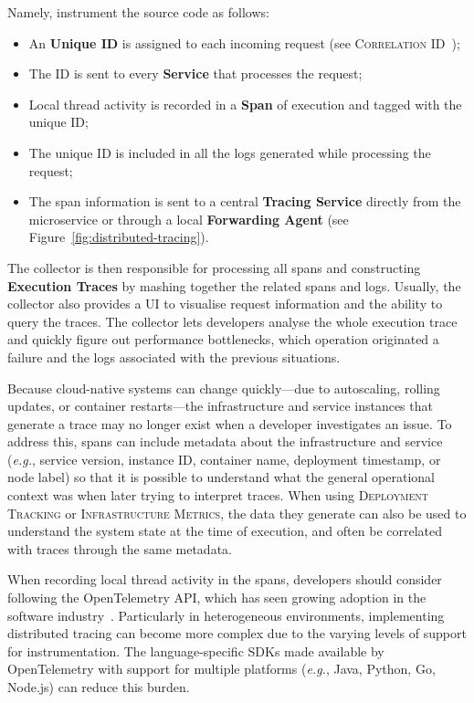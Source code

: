 \documentclass[runningheads]{llncs}
\begin{document}
Namely, instrument the source code as follows:
\begin{itemize}
    \item An \textbf{Unique ID} is assigned to each incoming request (see \textsc{Correlation ID}~\cite{Brown-Woolf-2016});
    \item The ID is sent to every \textbf{Service} that processes the request;
    \item Local thread activity is recorded in a \textbf{Span} of execution and tagged with the unique ID;
    \item The unique ID is included in all the logs generated while processing the request;
    \item The span information is sent to a central \textbf{Tracing Service} directly from the microservice or through a local \textbf{Forwarding Agent} (see Figure~\ref{fig:distributed-tracing}).
\end{itemize}

The collector is then responsible for processing all spans and constructing \textbf{Execution Traces} by mashing together the related spans and logs. Usually, the collector also provides a UI to visualise request information and the ability to query the traces. The collector lets developers analyse the whole execution trace and quickly figure out performance bottlenecks, which operation originated a failure and the logs associated with the previous situations.

Because cloud-native systems can change quickly---due to autoscaling, rolling updates, or container restarts---the infrastructure and service instances that generate a trace may no longer exist when a developer investigates an issue. To address this, spans can include metadata about the infrastructure and service (\textit{e.g.}, service version, instance ID, container name, deployment timestamp, or node label) so that it is possible to understand what the general operational context was when later trying to interpret traces. When using \textsc{Deployment Tracking} or \textsc{Infrastructure Metrics}, the data they generate can also be used to understand the system state at the time of execution, and often be correlated with traces through the same metadata.

When recording local thread activity in the spans, developers should consider following the OpenTelemetry API, which has seen growing adoption in the software industry~\cite{Newman-2021}. Particularly in heterogeneous environments, implementing distributed tracing can become more complex due to the varying levels of support for instrumentation. The language-specific SDKs made available by OpenTelemetry with support for multiple platforms (\textit{e.g.}, Java, Python, Go, Node.js) can reduce this burden.
\end{document}
